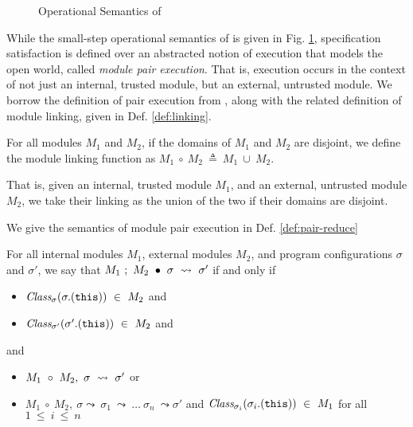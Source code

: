 \begin{figure}[t]
\caption{Operational Semantics of \Loo}
\label{f:loo-semantics}
\end{figure}

While the small-step operational semantics of \Loo is given in Fig. \ref{f:loo-semantics},
specification satisfaction is defined over an abstracted notion of 
execution that models the open world, called \emph{module pair execution}. 
That is, execution occurs in the context of not just an internal, trusted module, but 
an external, untrusted module. We borrow the definition of pair execution 
from \citeauthor{FASE}, along with the related definition of module linking, given in Def. \ref{def:linking}.
\begin{definition}
\label{def:linking}
For all modules $M_1$ and $M_2$, if the domains of $M_1$ and $M_2$ are disjoint, 
we define the module linking function as $M_1\ \circ\ M_2\ \triangleq\ M_1\ \cup\ M_2$.
\end{definition}
That is, given an internal, trusted module $M_1$, and an external, untrusted module $M_2$, 
we take their linking as the union of the two if their domains are disjoint.

We give the semantics of module pair execution in Def. \ref{def:pair-reduce}
\begin{definition}
\label{def:pair-reduce}
For all internal modules $M_1$, external modules $M_2$, and program configurations $\sigma$ and $\sigma'$, 
we say that $M_1\ ;\ M_2\ \bullet\ \sigma\ \leadsto\ \sigma'$ if and only if
\begin{itemize}
\item
$\class{\sigma}{\sigma.(\texttt{this})}\ \in\ M_2$ and
\item
$\class{\sigma'}{\sigma'.(\texttt{this})}\ \in\ M_2$ and 
\end{itemize} 
and
\begin{itemize}
\item
$\exec{M_1\ \circ\ M_2}{\sigma}{\sigma'}$ or
\item
$M_1\ \circ\ M_2,\ \sigma \leadsto\ \sigma_1\ \leadsto\ \ldots\ \sigma_n\ \leadsto \sigma'$ and $\class{\sigma_i}{\sigma_i.(\texttt{this})}\ \in\ M_1$ for all $1\ \leq\ i\ \leq\ n$
\end{itemize}
\end{definition}

